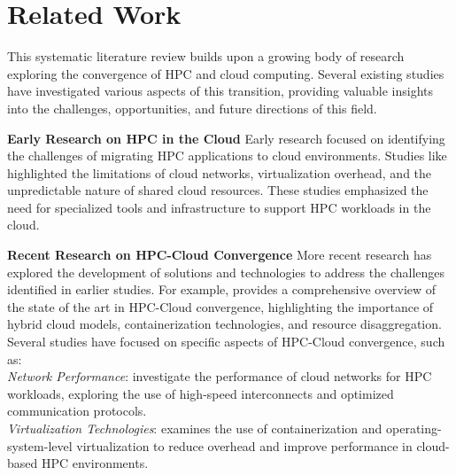 \section{Related Work}
\label{sec:related_work}

This systematic literature review builds upon a growing body of research exploring the convergence of HPC and cloud computing. Several existing studies have investigated various aspects of this transition, providing valuable insights into the challenges, opportunities, and future directions of this field.

\noindent
\textbf{Early Research on HPC in the Cloud}
Early research focused on identifying the challenges of migrating HPC applications to cloud environments. Studies like \cite{wang2010cloud, gupta2014challenges, marathe2013challenges} highlighted the limitations of cloud networks, virtualization overhead, and the unpredictable nature of shared cloud resources. These studies emphasized the need for specialized tools and infrastructure to support HPC workloads in the cloud.

\noindent
\textbf{Recent Research on HPC-Cloud Convergence}
More recent research has explored the development of solutions and technologies to address the challenges identified in earlier studies. For example, \cite{netto_hpc_2019} provides a comprehensive overview of the state of the art in HPC-Cloud convergence, highlighting the importance of hybrid cloud models, containerization technologies, and resource disaggregation.
Several studies have focused on specific aspects of HPC-Cloud convergence, such as: \\
\newline
\noindent
\textit{Network Performance}: \cite{alves_interference-aware_2020, giannoutakis_evaluation_2021} investigate the performance of cloud networks for HPC workloads, exploring the use of high-speed interconnects and optimized communication protocols.\\

\noindent
\textit{Virtualization Technologies}: \cite{marques_harnessing_2021} examines the use of containerization and operating-system-level virtualization to reduce overhead and improve performance in cloud-based HPC environments.\\

